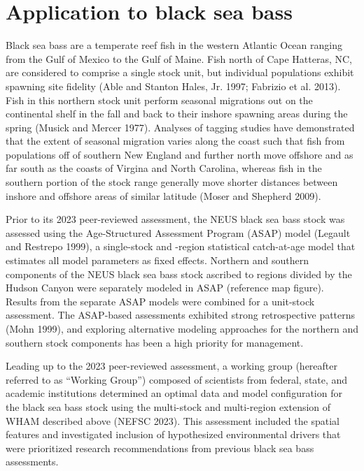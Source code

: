 \documentclass[
]{article}
\begin{document}
\hypertarget{application-to-black-sea-bass}{%
\section*{Application to black sea
bass}\label{application-to-black-sea-bass}}

Black sea bass are a temperate reef fish in the western Atlantic Ocean
ranging from the Gulf of Mexico to the Gulf of Maine. Fish north of Cape
Hatteras, NC, are considered to comprise a single stock unit, but
individual populations exhibit spawning site fidelity (Able and Stanton
Hales, Jr. 1997; Fabrizio et al. 2013). Fish in this northern stock unit
perform seasonal migrations out on the continental shelf in the fall and
back to their inshore spawning areas during the spring (Musick and
Mercer 1977). Analyses of tagging studies have demonstrated that the
extent of seasonal migration varies along the coast such that fish from
populations off of southern New England and further north move offshore
and as far south as the coasts of Virgina and North Carolina, whereas
fish in the southern portion of the stock range generally move shorter
distances between inshore and offshore areas of similar latitude (Moser
and Shepherd 2009).

Prior to its 2023 peer-reviewed assessment, the NEUS black sea bass
stock was assessed using the Age-Structured Assessment Program (ASAP)
model (Legault and Restrepo 1999), a single-stock and -region
statistical catch-at-age model that estimates all model parameters as
fixed effects. Northern and southern components of the NEUS black sea
bass stock ascribed to regions divided by the Hudson Canyon were
separately modeled in ASAP (reference map figure). Results from the
separate ASAP models were combined for a unit-stock assessment. The
ASAP-based assessments exhibited strong retrospective patterns (Mohn
1999), and exploring alternative modeling approaches for the northern
and southern stock components has been a high priority for management.

Leading up to the 2023 peer-reviewed assessment, a working group
(hereafter referred to as ``Working Group'') composed of scientists from
federal, state, and academic institutions determined an optimal data and
model configuration for the black sea bass stock using the multi-stock
and multi-region extension of WHAM described above (NEFSC 2023). This
assessment included the spatial features and investigated inclusion of
hypothesized environmental drivers that were prioritized research
recommendations from previous black sea bass assessments.
\end{document}
